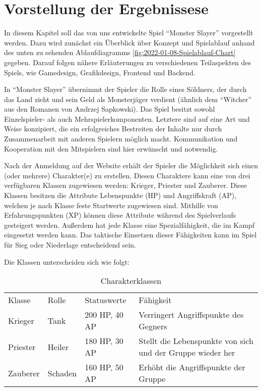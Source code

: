

\section{Vorstellung der Ergebnissese}

In diesem Kapitel soll das von uns entwickelte Spiel \enquote{Monster Slayer} vorgestellt werden. Dazu wird zunächst ein Überblick über Konzept und Spielablauf anhand des unten zu sehenden Ablaufdiagramms \ref{fig:2022-01-08-Spielablauf-Chart} gegeben. Darauf folgen nähere Erläuterungen zu verschiedenen Teilaspekten des Spiels, wie Gamedesign, Grafikdesign, Frontend und Backend. 

In \enquote{Monster Slayer} übernimmt der Spieler die Rolle eines Söldners, der durch das Land zieht und sein Geld als Monsterjäger verdient (ähnlich dem \enquote{Witcher} aus den Romanen von Andrzej Sapkowski). Das Spiel besitzt sowohl Einzelspieler- als auch Mehrspielerkomponenten. Letztere sind auf eine Art und Weise konzipiert, die ein erfolgreiches Bestreiten der Inhalte nur durch Zusammenarbeit mit anderen Spielern möglich macht. Kommunikation und Kooperation mit den Mitspielern sind hier erwünscht und notwendig. 

Nach der Anmeldung auf der Website erhält der Spieler die Möglichkeit sich einen (oder mehrere) Charakter(e) zu erstellen. Diesen Charaktere kann eine von drei verfügbaren Klassen zugewiesen werden: Krieger, Priester und Zauberer. Diese Klassen besitzen die Attribute Lebenspunkte (HP) und Angriffskraft (AP), welchen je nach Klasse feste Startwerte zugewiesen sind. Mithilfe von Erfahrungspunkten (XP) können diese Attribute während des Spielverlaufs gesteigert werden. Außerdem hat jede Klasse eine Spezialfähigkeit, die im Kampf eingesetzt werden kann. Das taktische Einsetzen dieser Fähigkeiten kann im Spiel für Sieg oder Niederlage entscheidend sein.

Die Klassen unterscheiden sich wie folgt:

\begin{table}[H]
    \caption{Charakterklassen}
    \label{tlb: class_table}
\begin{tabular}{ |p{}||p{}|p{}|p{}|} \hline
    Klasse & Rolle & Statuswerte & Fähigkeit \\ \hhline{|=||=|=|=|}
    Krieger & Tank & 200 HP, 40 AP & Verringert Angriffspunkte des Gegners \\ \hline
    Priester & Heiler & 180 HP, 30 AP & Stellt die Lebenspunkte von sich und der Gruppe wieder her \\ \hline
    Zauberer & Schaden & 160 HP, 50 AP & Erhöht die Angriffspunkte der Gruppe \\ \hline
\end{tabular}
\end{table}

